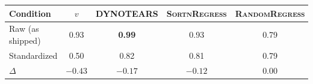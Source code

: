 \begin{tabular}{lcccc}
\toprule
Condition & $v$ & DYNOTEARS & \textsc{SortnRegress} & \textsc{RandomRegress} \\
\midrule
Raw (as shipped) & 0.93 & \textbf{0.99} & 0.93 & 0.79 \\
Standardized     & 0.50 & 0.82 & 0.81 & 0.79 \\
\midrule
$\Delta$         & $-0.43$ & $-0.17$ & $-0.12$ & $0.00$ \\
\bottomrule
\end{tabular}
